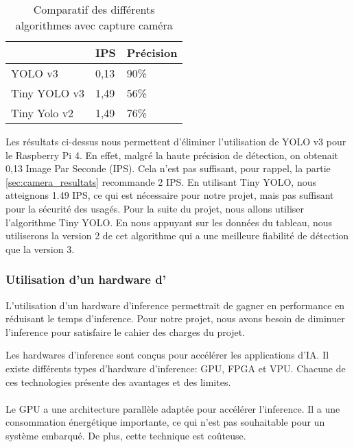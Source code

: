 \begin{table}[ht!]
    \centering
    \begin{tabular}{|l|l|l|}
    \hline
                 & IPS  & Précision \\ \hline
    YOLO v3      & 0,13 & 90\%      \\ \hline
    Tiny YOLO v3 & 1,49 & 56\%      \\ \hline
    Tiny Yolo v2 & 1,49 & 76\%      \\ \hline
    \end{tabular}
    \caption{Comparatif des différents algorithmes avec capture caméra}
    \label{fig:comparatifAlgoAvecCam}
    \end{table}

Les résultats ci-dessus nous permettent d'éliminer l'utilisation de YOLO v3 pour le Raspberry Pi 4. 
En effet, malgré la haute précision de détection, on obtenait 0,13 Image Par Seconde (IPS). 
Cela n'est pas suffisant, pour rappel, la partie \ref{sec:camera_resultats} recommande 2 IPS.
En utilisant Tiny YOLO, nous atteignons 1.49 IPS, ce qui est nécessaire pour notre projet, mais pas suffisant pour la sécurité des usagés.
Pour la suite du projet, nous allons utiliser l'algorithme Tiny YOLO. 
En nous appuyant sur les données du tableau, nous utiliserons la version 2 de cet algorithme qui a une meilleure fiabilité de détection que la version 3.

\subsubsection{Utilisation d'un hardware d'}
\label{sec:hwInference_hwinf}
L'utilisation d'un hardware d'\gls{inference} permettrait de gagner en performance en réduisant le temps d'\gls{inference}.
Pour notre projet, nous avons besoin de diminuer l'\gls{inference} pour satisfaire le cahier des charges du projet.

Les hardwares d'\gls{inference} sont conçus pour accélérer les applications d'\gls{IA}.
Il existe différents types d'hardware d'\gls{inference}: \gls{GPU}, \gls{FPGA} et \gls{VPU}. 
Chacune de ces technologies présente des avantages et des limites.

\paragraph{}
\label{sec:GPU_hwInf}
Le \gls{GPU} a une architecture parallèle adaptée pour accélérer l'\gls{inference}. 
Il a une consommation énergétique importante, ce qui n'est pas souhaitable pour un système embarqué. 
De plus, cette technique est coûteuse.

